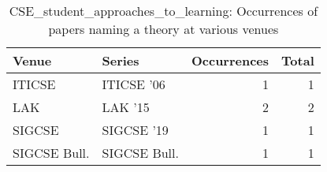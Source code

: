 \begin{table*}[t]
\begin{tabular}{llrr}
Venue & Series & Occurrences & Total\\\hline
\multirow{1}{*}{ITICSE } & ITICSE '06 & 1 & \multirow{1}{*}{1}\\
\multirow{1}{*}{LAK } & LAK '15 & 2 & \multirow{1}{*}{2}\\
\multirow{1}{*}{SIGCSE } & SIGCSE '19 & 1 & \multirow{1}{*}{1}\\
\multirow{1}{*}{SIGCSE Bull.} & SIGCSE Bull. & 1 & \multirow{1}{*}{1}\\
\end{tabular}
\caption{CSE\_student\_approaches\_to\_learning: Occurrences of papers naming a theory at various venues}
\end{table*}